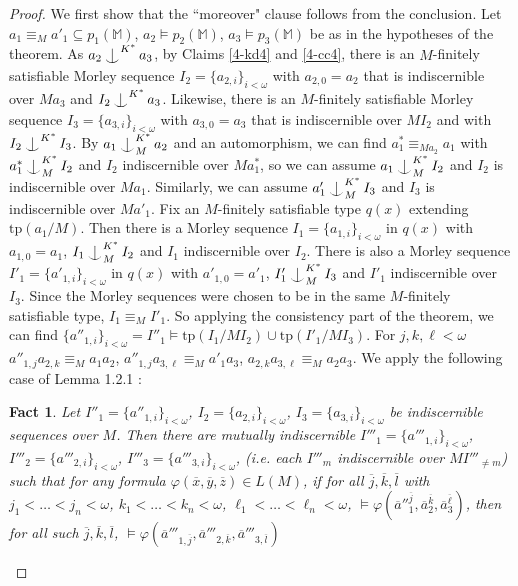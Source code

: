 \documentclass[12pt]{amsart}
\newtheorem{fact}[theorem]{Fact}
\theoremstyle{definition}
\def\Ind#1#2{#1\setbox0=\hbox{$#1x$}\kern\wd0\hbox to 0pt{\hss$#1\mid$\hss}
\lower.9\ht0\hbox to 0pt{\hss$#1\smile$\hss}\kern\wd0}
\def\ind{\mathop{\mathpalette\Ind{}}}
\begin{document}
\begin{proof}
We first show that the ``moreover" clause follows from the conclusion. Let $a_{1} \equiv_{M} a'_{1} \subseteq p_{1}(\mathbb{M})$, $ a_{2} \models p_{2}(\mathbb{M})$,  $ a_{3} \models p_{3}(\mathbb{M})$ be as in the hypotheses of the theorem. As $a_{2} \ind^{K^{*}}a_{3}$, by Claims \ref{4-kd4} and \ref{4-cc4}, there is an $M$-finitely satisfiable Morley sequence $I_{2}=\{a_{2, i}\}_{i < \omega}$ with $a_{2, 0}=a_{2}$ that is indiscernible over $Ma_{3}$ and $I_{2} \ind^{K^{*}}a_{3}$. Likewise, there is an $M$-finitely satisfiable Morley sequence $I_{3}=\{a_{3, i}\}_{i < \omega}$ with $a_{3, 0}=a_{3}$ that is indiscernible over $MI_{2}$ and with $I_{2} \ind^{K^{*}}I_{3}$. By $a_{1} \ind^{K^{*}}_{M} a_{2}$ and an automorphism, we can find $a^{*}_{1} \equiv_{Ma_{2}} a_{1}$ with $a^{*}_{1} \ind^{K^{*}}_{M} I_{2}$ and $I_{2}$ indiscernible over $Ma^{*}_{1}$, so we can assume $a_{1} \ind^{K^{*}}_{M} I_{2}$ and $I_{2}$ is indiscernible over $Ma_{1}$. Similarly, we can assume $a'_{1} \ind_{M}^{K^{*}}I_{3}$ and $I_{3}$ is indiscernible over $Ma'_{1}$. Fix an $M$-finitely satisfiable type $q(x)$ extending $\mathrm{tp}(a_{1}/M)$. Then there is a Morley sequence $I_{1} = \{a_{1, i}\}_{i < \omega}$ in $q(x)$ with $a_{1, 0}=a_{1}$, $I_{1} \ind^{K^{*}}_{M} I_{2}$ and $I_{1}$ indiscernible over $I_{2}$. There is also a Morley sequence $I'_{1} = \{a'_{1, i}\}_{i < \omega}$ in $q(x)$ with $a'_{1, 0}=a'_{1}$, $I'_{1} \ind^{K^{*}}_{M} I_{3}$ and $I'_{1}$ indiscernible over $I_{3}$. Since the Morley sequences were chosen to be in the same $M$-finitely satisfiable type, $I_{1} \equiv_{M} I'_{1}$. So applying the consistency part of the theorem, we can find $\{a''_{1, i}\}_{i < \omega}=I''_{1} \models \mathrm{tp}(I_{1}/MI_{2}) \cup \mathrm{tp}(I'_{1}/MI_{3})$. For $j, k, \ell < \omega$ $a''_{1, j}a_{2, k} \equiv_{M} a_{1}a_{2}$, $a''_{1, j}a_{3, \ell} \equiv_{M} a'_{1}a_{3}$, $a_{2, k}a_{3, \ell} \equiv_{M} a_{2}a_{3}$. We apply the following case of Lemma 1.2.1 \cite{Che14}:

\begin{fact}\label{4-indisc4}
Let $I''_{1}=\{a''_{1, i}\}_{i < \omega}$, $I_{2}=\{a_{2, i}\}_{i < \omega}$, $I_{3}=\{a_{3, i}\}_{i < \omega}$ be indiscernible sequences over $M$. Then there are mutually indiscernible $I'''_{1}=\{a'''_{1, i}\}_{i < \omega}$, $I'''_{2}=\{a'''_{2, i}\}_{i < \omega}$, $I'''_{3}=\{a'''_{3, i}\}_{i < \omega}$, (i.e. each $I'''_{m}$ indiscernible over $MI'''_{\neq m}$) such that for any formula $\varphi(\overline{x}, \overline{y}, \overline{z}) \in L(M)$, if for all $\overline{j}, \overline{k}, \overline{l}$ with $j_{1}< \ldots<  j_{n} < \omega$, $k_{1}< \ldots<  k_{n} < \omega$, $\ell_{1}< \ldots<  \ell_{n} < \omega$, $\models \varphi(\overline{a}''^{\overline{j}}_{1}, \overline{a}^{\overline{k}}_{2}, \overline{a}^{\overline{\ell}}_{3})  $, then for all such $\overline{j}, \overline{k}, \overline{l}$, $\models \varphi(\overline{a}'''_{1, \overline{j}}, \overline{a}'''_{2, \overline{k}}, \overline{a}'''_{3, \overline{l}})  $ 
\end{fact}


\end{proof}
\end{document}
